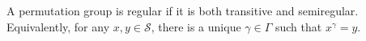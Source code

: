 A permutation group is regular if it is both transitive and semiregular. Equivalently, for any $x, y \in \mathcal{S}$, there is a unique $\gamma \in \Gamma$ such that $x^\gamma = y$.
